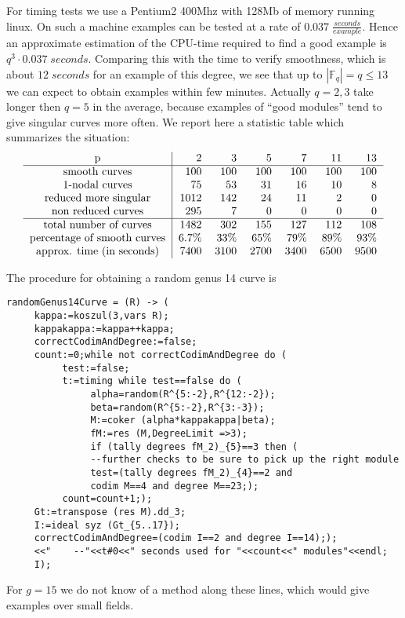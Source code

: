 \documentclass[12pt,leqno]{amsart}
\newcommand{\FF}{{\mathbb F}}
\newlength{\ho}
\begin{document}
\noindent
For timing tests we use a Pentium2 400Mhz with 128Mb of memory running linux.
On such a machine examples can be tested at a rate 
of $0.037 \; \frac{seconds}{example}$.
Hence an approximate estimation of the CPU-time required to find a good example 
is $q^3 \cdot 0.037 \; seconds$.
Comparing this with the time to verify smoothness, 
which is about $12 \; seconds$ for an example of this degree,
we see that up to $|\FF_q|=q \le 13$ we can expect to obtain examples within 
few minutes.
Actually $q=2,3$ take longer then $q=5$ in the average, 
because examples of ``good modules'' tend to give singular curves more often. 
We report here a statistic table which summarizes the situation:
$$
\begin{tabular}{c|rrrrrrr}
p&                              2   &3   &5   &7   &11  &13\cr
\hline
smooth curves &                 100 &100 &100 &100 &100 &100\cr
1-nodal curves &                75  &53  &31  &16  &10  &8\cr
reduced more singular &         1012&142 &24  &11  &2   &0\cr
non reduced curves &            295 &7   &0   &0   &0   &0\cr
\hline
total number of curves &        1482&302 &155 &127 &112 &108\cr
percentage of smooth curves &   6.7\% &33\%  &65\%  &79\%  &89\% &93\%\cr
approx. time (in seconds) &     7400&3100&2700&3400&6500&9500\cr
\end{tabular}
$$

\medskip
\noindent
The procedure for obtaining a random genus 14 curve is
{\scriptsize
\begin{verbatim} 
randomGenus14Curve = (R) -> (
     kappa:=koszul(3,vars R);
     kappakappa:=kappa++kappa;
     correctCodimAndDegree:=false;
     count:=0;while not correctCodimAndDegree do (
          test:=false;
          t:=timing while test==false do (
               alpha=random(R^{5:-2},R^{12:-2});
               beta=random(R^{5:-2},R^{3:-3});
               M:=coker (alpha*kappakappa|beta);
               fM:=res (M,DegreeLimit =>3);
               if (tally degrees fM_2)_{5}==3 then (
               --further checks to be sure to pick up the right module
               test=(tally degrees fM_2)_{4}==2 and
               codim M==4 and degree M==23;);
          count=count+1;);
     Gt:=transpose (res M).dd_3;
     I:=ideal syz (Gt_{5..17});
     correctCodimAndDegree=(codim I==2 and degree I==14););
     <<"    --"<<t#0<<" seconds used for "<<count<<" modules"<<endl;
     I);
\end{verbatim}}


\medskip
For $g=15$ we  do not know of a method along these lines, 
which would give examples over small fields.
\end{document}
